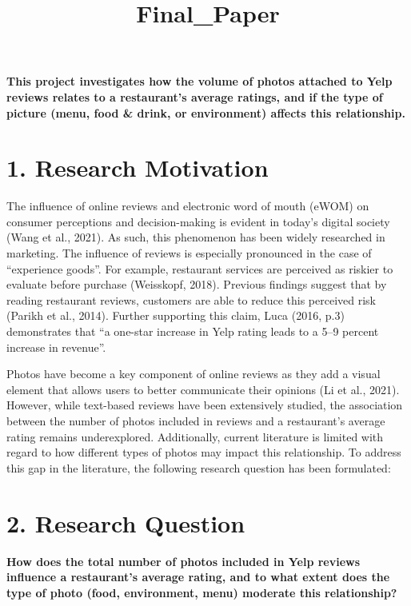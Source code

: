 \documentclass[
]{article}
\title{Final\_Paper}
\author{}
\date{\vspace{-2.5em}}
\begin{document}
\maketitle

{
\setcounter{tocdepth}{2}
\tableofcontents
}
\textbf{This project investigates how the volume of photos attached to
Yelp reviews relates to a restaurant's average ratings, and if the type
of picture (menu, food \& drink, or environment) affects this
relationship.}

\section{1. Research Motivation}\label{research-motivation}

The influence of online reviews and electronic word of mouth (eWOM) on
consumer perceptions and decision-making is evident in today's digital
society (Wang et al., 2021). As such, this phenomenon has been widely
researched in marketing. The influence of reviews is especially
pronounced in the case of ``experience goods''. For example, restaurant
services are perceived as riskier to evaluate before purchase
(Weisskopf, 2018). Previous findings suggest that by reading restaurant
reviews, customers are able to reduce this perceived risk (Parikh et
al., 2014). Further supporting this claim, Luca (2016, p.3) demonstrates
that ``a one-star increase in Yelp rating leads to a 5--9 percent
increase in revenue''.

Photos have become a key component of online reviews as they add a
visual element that allows users to better communicate their opinions
(Li et al., 2021). However, while text-based reviews have been
extensively studied, the association between the number of photos
included in reviews and a restaurant's average rating remains
underexplored. Additionally, current literature is limited with regard
to how different types of photos may impact this relationship. To
address this gap in the literature, the following research question has
been formulated:

\section{2. Research Question}\label{research-question}

\textbf{How does the total number of photos included in Yelp reviews
influence a restaurant's average rating, and to what extent does the
type of photo (food, environment, menu) moderate this relationship?}
\end{document}
